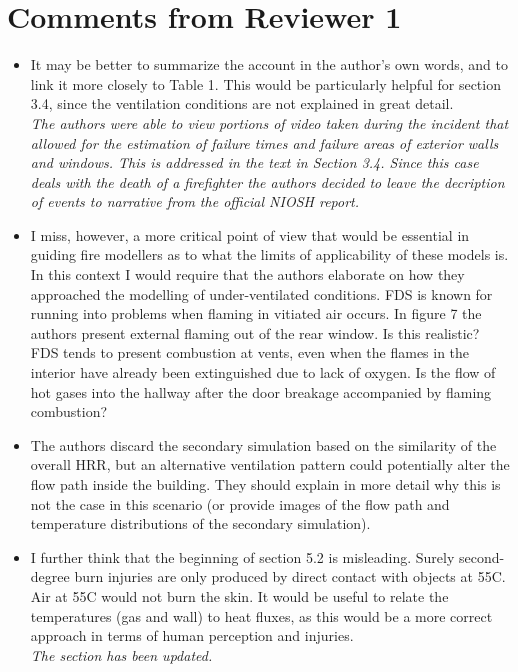 \documentclass[12pt]{article}
\begin{document}
\section{Comments from Reviewer 1}
\begin{itemize}
\item It may be better to summarize the account in the author's own words, and to link it more closely to Table 1. This would be particularly helpful for section 3.4, since the ventilation conditions are not explained in great detail. \\
{\it The authors were able to view portions of video taken during the incident that allowed for the estimation of failure times and failure areas of exterior walls and windows. This is addressed in the text in Section 3.4. Since this case deals with the death of a firefighter the authors decided to leave the decription of events to narrative from the official NIOSH report.}
\item I miss, however, a more critical point of view that would be essential in guiding fire modellers as to what the limits of applicability of these models is. In this context I would require that the authors elaborate on how they approached the modelling of under-ventilated conditions. FDS is known for running into problems when flaming in vitiated air occurs. In figure 7 the authors present external flaming out of the rear window. Is this realistic? FDS tends to present combustion at vents, even when the flames in the interior have already been extinguished due to lack of oxygen. Is the flow of hot gases into the hallway after the door breakage accompanied by flaming combustion?
\item The authors discard the secondary simulation based on the similarity of the overall HRR, but an alternative ventilation pattern could potentially alter the flow path inside the building. They should explain in more detail why this is not the case in this scenario (or provide images of the flow path and temperature distributions of the secondary simulation).
\item I further think that the beginning of section 5.2 is misleading. Surely second-degree burn injuries are only produced by direct contact with objects at 55C. Air at 55C would not burn the skin. It would be useful to relate the temperatures (gas and wall) to heat fluxes, as this would be a more correct approach in terms of human perception and injuries. \\
{\it The section has been updated.}
\end{itemize}
\end{document}
